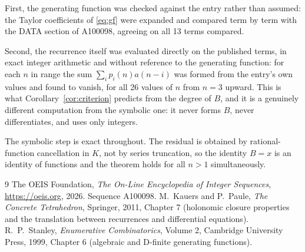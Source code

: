 \documentclass[11pt,a4paper]{article}
\theoremstyle{plain}
\theoremstyle{definition}
\begin{document}
First, the generating function was checked against the entry rather than assumed: the
Taylor coefficients of \eqref{eq:gf} were expanded and compared term by term with the DATA
section of A100098, agreeing on all 13 terms compared.

Second, the recurrence itself was evaluated directly on the published terms, in exact
integer arithmetic and without reference to the generating function: for each $n$ in range
the sum $\sum_{i}p_{i}(n)a(n-i)$ was formed from the entry's own values and found to
vanish, for all 26 values of $n$ from $n=3$ upward. This is what
Corollary~\ref{cor:criterion} predicts from the degree of $B$, and it is a genuinely
different computation from the symbolic one: it never forms $B$, never differentiates, and
uses only integers.

The symbolic step is exact throughout. The residual is obtained by rational-function
cancellation in $K$, not by series truncation, so the identity $B=x$ is an
identity of functions and the theorem holds for all $n>1$ simultaneously.

\begin{thebibliography}{9}
 The OEIS Foundation, \emph{The On-Line Encyclopedia of Integer Sequences},
\url{https://oeis.org}, 2026. Sequence A100098.
 M.~Kauers and P.~Paule, \emph{The Concrete Tetrahedron}, Springer, 2011,
Chapter 7 (holonomic closure properties and the translation between recurrences and
differential equations).
 R.~P.~Stanley, \emph{Enumerative Combinatorics}, Volume 2, Cambridge
University Press, 1999, Chapter 6 (algebraic and D-finite generating functions).
\end{thebibliography}
\end{document}
